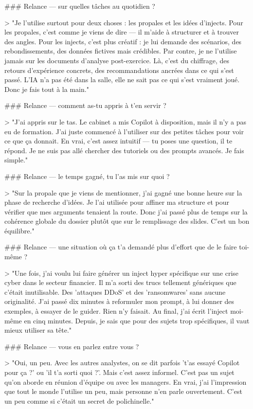 ### Relance — sur quelles tâches au quotidien ?

> "Je l'utilise surtout pour deux choses : les propales et les idées d'injects. Pour les propales, c'est comme je viens de dire — il m'aide à structurer et à trouver des angles. Pour les injects, c'est plus créatif : je lui demande des scénarios, des rebondissements, des données fictives mais crédibles. Par contre, je ne l'utilise jamais sur les documents d'analyse post-exercice. Là, c'est du chiffrage, des retours d'expérience concrets, des recommandations ancrées dans ce qui s'est passé. L'IA n'a pas été dans la salle, elle ne sait pas ce qui s'est vraiment joué. Donc je fais tout à la main."

### Relance — comment as-tu appris à t'en servir ?

> "J'ai appris sur le tas. Le cabinet a mis Copilot à disposition, mais il n'y a pas eu de formation. J'ai juste commencé à l'utiliser sur des petites tâches pour voir ce que ça donnait. En vrai, c'est assez intuitif — tu poses une question, il te répond. Je ne suis pas allé chercher des tutoriels ou des prompts avancés. Je fais simple."

### Relance — le temps gagné, tu l'as mis sur quoi ?

> "Sur la propale que je viens de mentionner, j'ai gagné une bonne heure sur la phase de recherche d'idées. Je l'ai utilisée pour affiner ma structure et pour vérifier que mes arguments tenaient la route. Donc j'ai passé plus de temps sur la cohérence globale du dossier plutôt que sur le remplissage des slides. C'est un bon équilibre."

### Relance — une situation où ça t'a demandé plus d'effort que de le faire toi-même ?

> "Une fois, j'ai voulu lui faire générer un inject hyper spécifique sur une crise cyber dans le secteur financier. Il m'a sorti des trucs tellement génériques que c'était inutilisable. Des 'attaques DDoS' et des 'ransomwares' sans aucune originalité. J'ai passé dix minutes à reformuler mon prompt, à lui donner des exemples, à essayer de le guider. Rien n'y faisait. Au final, j'ai écrit l'inject moi-même en cinq minutes. Depuis, je sais que pour des sujets trop spécifiques, il vaut mieux utiliser sa tête."

### Relance — vous en parlez entre vous ?

> "Oui, un peu. Avec les autres analystes, on se dit parfois 't'as essayé Copilot pour ça ?' ou 'il t'a sorti quoi ?'. Mais c'est assez informel. C'est pas un sujet qu'on aborde en réunion d'équipe ou avec les managers. En vrai, j'ai l'impression que tout le monde l'utilise un peu, mais personne n'en parle ouvertement. C'est un peu comme si c'était un secret de polichinelle."

